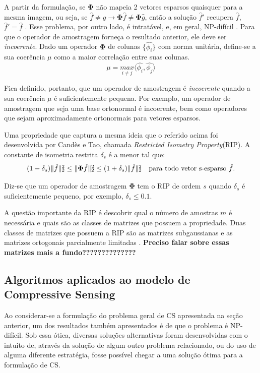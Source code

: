 \documentclass[cic,tc]{iiufrgs}
\def\SPSB#1#2{\rlap{\textsuperscript{#1}}\SB{#2}}
\def\SB#1{\textsubscript{#1}}
\begin{document}
A partir da formulação, se $\mathbf{\Phi}$ não mapeia 2 vetores esparsos quaisquer para a mesma imagem, ou seja,
se $\hat{f} \ne \hat{g} \rightarrow \mathbf{\Phi}\hat{f} \ne \mathbf{\Phi}\hat{g} $, então a solução $\hat{f}'$ recupera
$\hat{f}$, $\hat{f}' = \hat{f}$ \cite{chen2015compressed}. Esse problema, por outro lado, é intratável, e, em geral,
NP-difícil \cite{Mut05}.
Para que o operador de amostragem forneça o resultado anterior, ele deve ser \textit{incoerente}.
Dado um operador $\mathbf{\Phi}$ de colunas $\{ \hat{\phi_i} \}$  com norma unitária, define-se a sua coerência $\mu$
como a maior correlação entre suas colunas.
\begin{equation}
    \label{eq:coerence}
    \mu = \underset{i \ne j}{max}\langle \hat{\phi_i} , \hat{\phi_j} \rangle
\end{equation}

Fica definido, portanto, que um operador de amostragem é \textit{incoerente} quando a sua coerência $\mu$ é 
suficientemente pequena. Por exemplo, um operador de amostragem que seja uma base ortonormal é incoerente, bem como
operadores que sejam aproximadamente ortonormais para vetores esparsos.

Uma propriedade que captura a mesma ideia que o referido acima foi desenvolvida por Candès e Tao, chamada 
\textit{Restricted Isometry Property}(RIP)\cite{CandesSignalRecovery}. A constante de isometria restrita 
$\delta_s$ é a menor tal que:
\begin{equation}
    \label{eq:rip}
    (1 - \delta_s)\lVert \hat{f} \rVert\SPSB{2}{2} \le \lVert \mathbf{\Phi} \hat{f} \rVert \SPSB{2}{2} \le 
    (1 + \delta_s)\lVert \hat{f} \rVert\SPSB{2}{2} \hspace{1em} \text{para todo vetor s-esparso } \hat{f}.
\end{equation}

Diz-se que um operador de amostragem $\mathbf{\Phi}$ tem o RIP de ordem $s$ quando $\delta_s$ é suficientemente
pequeno, por exemplo, $\delta_s \le 0.1$.

A questão importante da RIP é descobrir qual o número de amostras $m$ é necessária e quais são as 
classes de matrizes que possuem a propriedade. Duas classes de matrizes que possuem a RIP são as 
matrizes subgaussianas \cite{Mendelson2008} e as matrizes ortogonais parcialmente limitadas \cite{rudelson2008sparse}.
\textbf{Preciso falar sobre essas matrizes mais a fundo??????????????}


\subsection{Algoritmos aplicados ao modelo de Compressive Sensing}
Ao considerar-se a formulação do problema geral de CS apresentada na seção anterior, um dos resultados também apresentados
é de que o problema é NP-difícil. Sob essa ótica, diversas soluções alternativas foram desenvolvidas com 
o intuito de, através da solução de algum outro problema relacionado, ou do uso de alguma diferente estratégia, fosse possível 
chegar a uma solução ótima para a formulação de CS. 
\end{document}
